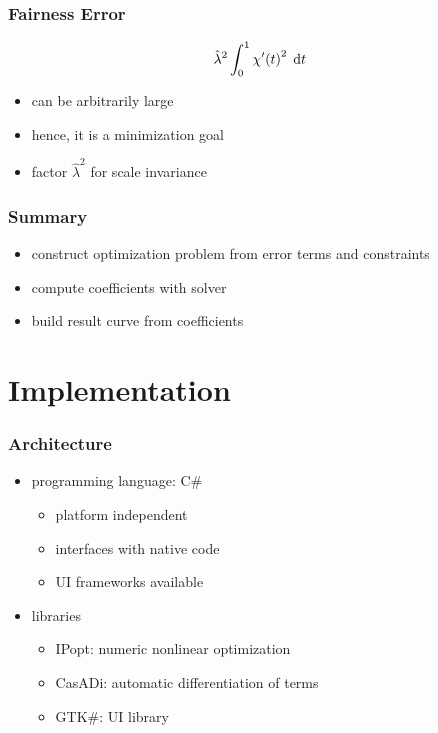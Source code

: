 \documentclass{beamer}
\begin{document}
		\begin{frame}
			\frametitle{Fairness Error}
			\begin{equation*}
				\hat{\lambda}^2\int_{0}^{1} \chi'\!\left( t \right)^2 \; \mathrm{d}t
			\end{equation*}
			\begin{itemize}
				\item can be arbitrarily large
				\item hence, it is a minimization goal
				\item factor \(\hat{\lambda}^2\) for scale invariance
			\end{itemize}
		\end{frame}
		
		\begin{frame}
			\frametitle{Summary}
			\begin{itemize}
				\item construct optimization problem from error terms and constraints
				\item compute coefficients with solver
				\item build result curve from coefficients
			\end{itemize}
		\end{frame}
		
	\section{Implementation}
	
		\begin{frame}
			\frametitle{Architecture}
			\begin{itemize}
				\item programming language: C\#
				\begin{itemize}
					\item platform independent
					\item interfaces with native code
					\item UI frameworks available
				\end{itemize}
				\item libraries
				\begin{itemize}
					\item IPopt: numeric nonlinear optimization
					\item CasADi: automatic differentiation of terms
					\item GTK\#: UI library
				\end{itemize}
			\end{itemize}
		\end{frame}
		
\end{document}
